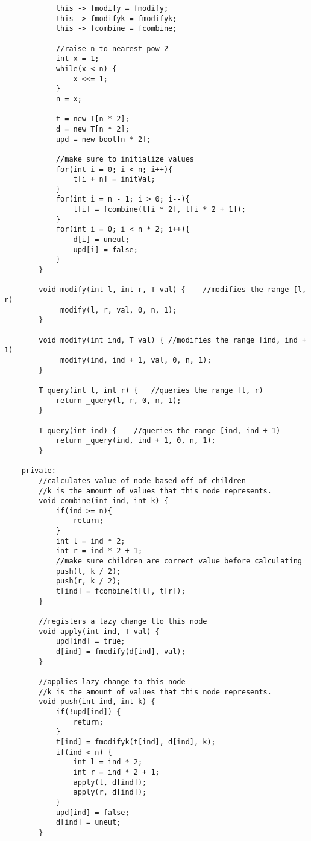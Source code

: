 \documentclass[8pt, headheight=10pt]{scrartcl}
\begin{document}
\begin{multicols*}{3}
\begin{lstlisting}
            this -> fmodify = fmodify;
            this -> fmodifyk = fmodifyk;
            this -> fcombine = fcombine;

            //raise n to nearest pow 2
            int x = 1;
            while(x < n) {
                x <<= 1;
            }
            n = x;

            t = new T[n * 2];
            d = new T[n * 2];
            upd = new bool[n * 2];

            //make sure to initialize values
            for(int i = 0; i < n; i++){
                t[i + n] = initVal;
            }
            for(int i = n - 1; i > 0; i--){
                t[i] = fcombine(t[i * 2], t[i * 2 + 1]);
            }
            for(int i = 0; i < n * 2; i++){
                d[i] = uneut;
                upd[i] = false;
            }
        }

        void modify(int l, int r, T val) {    //modifies the range [l, r)
            _modify(l, r, val, 0, n, 1);
        }

        void modify(int ind, T val) { //modifies the range [ind, ind + 1)
            _modify(ind, ind + 1, val, 0, n, 1);
        }

        T query(int l, int r) {   //queries the range [l, r)
            return _query(l, r, 0, n, 1);
        }

        T query(int ind) {    //queries the range [ind, ind + 1)
            return _query(ind, ind + 1, 0, n, 1);
        }

    private:
        //calculates value of node based off of children
        //k is the amount of values that this node represents. 
        void combine(int ind, int k) {
            if(ind >= n){
                return;
            }
            int l = ind * 2;
            int r = ind * 2 + 1;
            //make sure children are correct value before calculating
            push(l, k / 2);
            push(r, k / 2);
            t[ind] = fcombine(t[l], t[r]);
        }

        //registers a lazy change llo this node
        void apply(int ind, T val) {
            upd[ind] = true;
            d[ind] = fmodify(d[ind], val);
        }

        //applies lazy change to this node
        //k is the amount of values that this node represents. 
        void push(int ind, int k) {
            if(!upd[ind]) {
                return;
            }
            t[ind] = fmodifyk(t[ind], d[ind], k);
            if(ind < n) {
                int l = ind * 2;
                int r = ind * 2 + 1;
                apply(l, d[ind]);
                apply(r, d[ind]);
            }
            upd[ind] = false;
            d[ind] = uneut;
        }


\end{lstlisting}
\end{multicols*}
\end{document}
